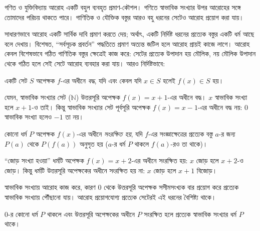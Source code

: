 \documentclass[../../../include/open-logic-section]{subfiles}
\begin{document}


\begin{explain}
গণিত ও যুক্তিবিদ্যায় আরোহ একটি বহুল ব্যবহৃত প্রমাণ-কৌশল।
গণিতে স্বাভাবিক সংখ্যার উপর আরোহের সঙ্গে তোমাদের পরিচয় থাকতে পারে।
গাণিতিক ও যৌক্তিক বস্তুর আরও বহু ধরনের সেটেও আরোহ প্রয়োগ করা যায়।

সাধারণভাবে আরোহ একটি সার্বিক দাবি প্রমাণ করতে দেয়; অর্থাৎ,
একটি নির্দিষ্ট ধরনের প্রত্যেক বস্তুর একটি ধর্ম আছে বলে দেখায়।
বিশেষত, “সর্বসূচক প্রবর্তন” পদ্ধতিতে প্রমাণ অত্যন্ত জটিল হলে
আরোহ প্রায়ই কাজে লাগে। আরোহ কেবল বিশেষভাবে গঠিত গাণিতিক
বস্তুর ক্ষেত্রেই কাজ করে: সেটের প্রত্যেক উপাদান হয় মৌলিক,
নয় মৌলিক উপাদান থেকে গঠিত হলে সেই সেটে আরোহ ব্যবহার করা যায়।
আরও নির্দিষ্টভাবে:
\end{explain}

\begin{defn}
একটি সেট $S$ অপেক্ষক $f$-এর অধীনে \emph{বদ্ধ}, যদি এবং কেবল যদি
$x \in S$ হলেই $f(x) \in S$ হয়।
\end{defn}

\begin{explain}
যেমন, স্বাভাবিক সংখ্যার সেট ($\mathbb{N}$) উত্তরসূরি অপেক্ষক
$f(x) = x+1$-এর অধীনে বদ্ধ। $x$ স্বাভাবিক সংখ্যা হলে $x+1$-ও তাই।
কিন্তু স্বাভাবিক সংখ্যার সেট পূর্বসূরি অপেক্ষক $f(x) = x-1$-এর
অধীনে বদ্ধ নয়: $0$ স্বাভাবিক সংখ্যা হলেও $-1$ তা নয়।
\end{explain}

\begin{defn}
কোনো ধর্ম $P$ অপেক্ষক $f(x)$-এর অধীনে \emph{সংরক্ষিত হয়}, যদি
$f$-এর সংজ্ঞাক্ষেত্রের প্রত্যেক বস্তু $a$-র জন্য $P(a)$ থেকে
$P(f(a))$ অনুসৃত হয় ($a$-র ধর্ম $P$ থাকলে $f(a)$-রও তা থাকে)।
\end{defn}

\begin{explain}
“জোড় সংখ্যা হওয়া” ধর্মটি অপেক্ষক $f(x) = x+2$-এর অধীনে
সংরক্ষিত হয়: $x$ জোড় হলে $x+2$-ও জোড়।
কিন্তু ধর্মটি উত্তরসূরি অপেক্ষকের অধীনে সংরক্ষিত হয় না:
$x$ জোড় হলে $x+1$ বিজোড়।

স্বাভাবিক সংখ্যায় আরোহ কাজ করে, কারণ 0 থেকে উত্তরসূরি অপেক্ষক
সসীমসংখ্যক বার প্রয়োগ করে প্রত্যেক স্বাভাবিক সংখ্যায় পৌঁছানো যায়।
আরোহ প্রয়োগযোগ্য প্রত্যেক সেটেরই এই ধরনের বৈশিষ্ট্য থাকে।
\end{explain}

\begin{defn}
0-র কোনো ধর্ম $P$ থাকলে এবং উত্তরসূরি অপেক্ষকের অধীনে
$P$ সংরক্ষিত হলে প্রত্যেক স্বাভাবিক সংখ্যার ধর্ম $P$ থাকে।
\end{defn}
\end{document}
